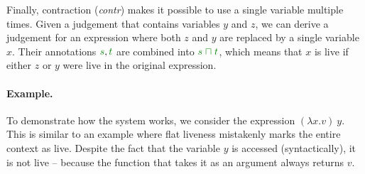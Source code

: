 Finally, contraction (\emph{contr}) makes it possible to use a single variable multiple times.
Given a judgement that contains variables $y$ and $z$, we can derive a judgement for an expression
where both $z$ and $y$ are replaced by a single variable $x$. Their annotations $\cclrd{s}, \cclrd{t}$
are combined into $\cclrd{s} \;\cclrd{\sqcap}\; \cclrd{t}$, which means that $x$ is live if either $z$ or $y$
were live in the original expression.

\paragraph{Example.} To demonstrate how the system works, we consider the expression
$(\lambda x . v)~y$. This is similar to an example where flat liveness mistakenly marks
the entire context as live. Despite the fact that the variable $y$ is accessed (syntactically), it
is not live -- because the function that takes it as an argument always returns $v$.

